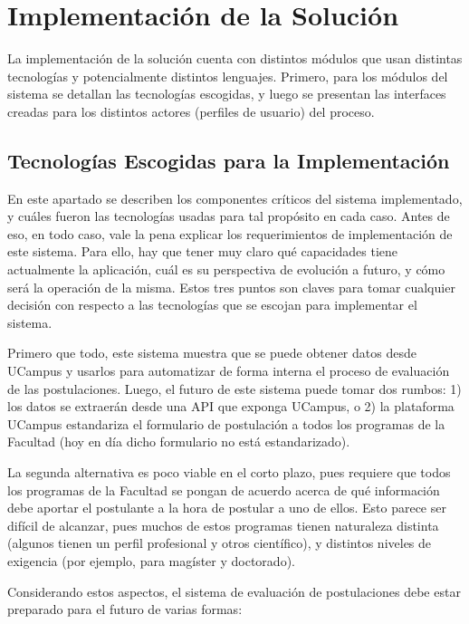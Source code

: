 \chapter{Implementación de la Solución}

La implementación de la solución cuenta con distintos módulos que usan distintas
tecnologías y potencialmente distintos lenguajes. Primero, para los módulos del
sistema se detallan las tecnologías escogidas, y luego se presentan las
interfaces creadas para los distintos actores (perfiles de usuario) del proceso.

\section{Tecnologías Escogidas para la Implementación}

En este apartado se describen los componentes críticos del sistema implementado,
y cuáles fueron las tecnologías usadas para tal propósito en cada caso. Antes de
eso, en todo caso, vale la pena explicar los requerimientos de implementación de
este sistema. Para ello, hay que tener muy claro qué capacidades tiene
actualmente la aplicación, cuál es su perspectiva de evolución a futuro, y cómo
será la operación de la misma. Estos tres puntos son claves para tomar cualquier
decisión con respecto a las tecnologías que se escojan para implementar el
sistema.

Primero que todo, este sistema muestra que se puede obtener datos desde UCampus
y usarlos para automatizar de forma interna el proceso de evaluación de las
postulaciones. Luego, el futuro de este sistema puede tomar dos rumbos: 1) los
datos se extraerán desde una API que exponga UCampus, o 2) la plataforma UCampus
estandariza el formulario de postulación a todos los programas de la Facultad
(hoy en día dicho formulario no está estandarizado). 

La segunda alternativa es poco viable en el corto plazo, pues requiere que todos
los programas de la Facultad se pongan de acuerdo acerca de qué información debe
aportar el postulante a la hora de postular a uno de ellos. Esto parece ser
difícil de alcanzar, pues muchos de estos programas tienen naturaleza distinta
(algunos tienen un perfil profesional y otros científico), y distintos niveles
de exigencia (por ejemplo, para magíster y doctorado).

Considerando estos aspectos, el sistema de evaluación de postulaciones debe
estar preparado para el futuro de varias formas: 

